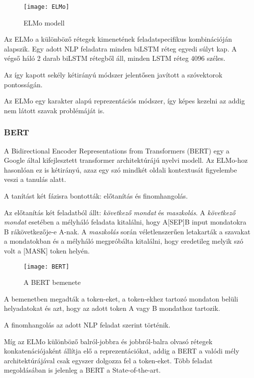 \begin{figure}[H]
	\centering
	\texttt{[image: ELMo]}
	\caption{ELMo modell}
\end{figure}

Az ELMo a különböző rétegek kimenetének feladatspecifikus kombinációján alapszik. Egy adott NLP feladatra minden biLSTM réteg egyedi súlyt kap. A végső háló 2 darab biLSTM rétegből áll, minden LSTM réteg 4096 széles.

Az így kapott sekély kétirányú módszer jelentősen javított a szóvektorok pontosságán.

\begin{note}
	Az ELMo egy karakter alapú reprezentációs módszer, így képes kezelni az addig nem látott szavak problémáját is.
\end{note}

\subsubsection{BERT}
A Bidirectional Encoder Representations from Transformers (BERT) egy a Google által kifejlesztett transformer architektúrájú nyelvi modell. Az ELMo-hoz hasonlóan ez is kétirányú, azaz egy szó mindkét oldali kontextusát figyelembe veszi a tanulás alatt. 

A tanítást két fázisra bontották: előtanítás és finomhangolás.

Az előtanítás két feladatból állt: \textit{következő mondat} és \textit{maszkolás}. A \textit{következő mondat} esetében a mélyháló feladata kitalálni, hogy A[SEP]B input mondatokra B rákövetkezője-e A-nak. A \textit{maszkolás} során véletlenszerűen letakarták a szavakat a mondatokban és a mélyháló megpróbálta kitalálni, hogy eredetileg melyik szó volt a [MASK] token helyén.

\begin{figure}[H]
	\centering
	\texttt{[image: BERT]}
	\caption{A BERT bemenete}
\end{figure}

A bemenetben megadták a token-eket, a token-ekhez tartozó mondaton belüli helyadatokat és azt, hogy az adott token A vagy B mondathoz tartozik.


A finomhangolás az adott NLP feladat szerint történik.

\begin{note}
	Míg az ELMo különböző balról-jobbra és jobbról-balra olvasó rétegek konkatenációjaként állítja elő a reprezentációkat, addig a BERT a valódi mély architektúrájával csak egyszer dolgozza fel a token-eket. Több feladat megoldásában is jelenleg a BERT a State-of-the-art.
\end{note}



